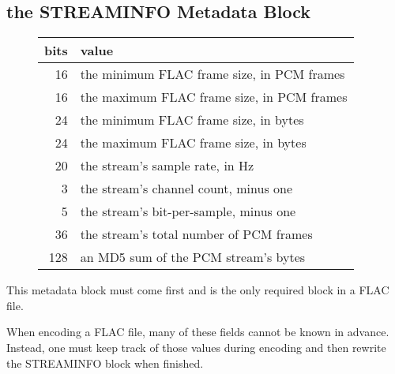 \subsection{the STREAMINFO Metadata Block}
\begin{figure}[h]
\begin{tabular}{|r|l|}
\hline
bits & value \\
\hline
16 & the minimum FLAC frame size, in PCM frames \\
16 & the maximum FLAC frame size, in PCM frames \\
24 & the minimum FLAC frame size, in bytes \\
24 & the maximum FLAC frame size, in bytes \\
20 & the stream's sample rate, in Hz \\
3 & the stream's channel count, minus one \\
5 & the stream's bit-per-sample, minus one \\
36 & the stream's total number of PCM frames \\
128 & an MD5 sum of the PCM stream's bytes \\
\hline
\end{tabular}
\end{figure}
\par
\noindent
This metadata block must come first and is the only required block
in a FLAC file.

When encoding a FLAC file, many of these fields cannot be known in advance.
Instead, one must keep track of those values during encoding and then
rewrite the STREAMINFO block when finished.

